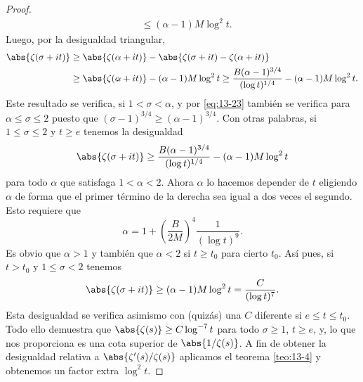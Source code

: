 \begin{proof}
\begin{align*}
            &\leq(\alpha-1)M\log^2t.
        \end{align*}
        Luego, por la desigualdad triangular,
        \begin{align*}
            \abs{\zeta(\sigma+it)}&\geq\abs{\zeta(\alpha+it)}-\abs{\zeta(\sigma+it)-\zeta(\alpha+it)}\\
            &\geq\abs{\zeta(\alpha+it)}-(\alpha-1)M\log^2t\geq\frac{B(\alpha-1)^{3/4}}{(\log t)^{1/4}}-(\alpha-1)M\log^2t.
        \end{align*}
        Este resultado se verifica, si $1<\sigma<\alpha$, y por \eqref{eq:13-23} también se
        verifica para $\alpha\leq\sigma\leq2$ puesto que $(\sigma-1)^{3/4}\geq(\alpha-1)^{3/4}$.
        Con otras palabras, si $1\leq\sigma\leq2$ y $t\geq e$ tenemos la desigualdad
        \begin{equation*}
            \abs{\zeta(\sigma+it)}\geq\frac{B(\alpha-1)^{3/4}}{(\log t)^{1/4}}-(\alpha-1)M\log^2t
        \end{equation*}
        para todo $\alpha$ que satisfaga $1<\alpha<2$. Ahora $\alpha$ lo hacemos depender de $t$
        eligiendo $\alpha$ de forma que el primer término de la derecha sea igual a dos veces el
        segundo. Esto requiere que
        \begin{equation*}
            \alpha=1+\left(\frac{B}{2M}\right)^4\frac{1}{(\log t)^9}.
        \end{equation*}
        Es obvio que $\alpha>1$ y también que $\alpha<2$ si $t\geq t_0$ para cierto $t_0$. Así
        pues, si $t>t_0$ y $1\leq\sigma<2$ tenemos
        \begin{equation*}
            \abs{\zeta(\sigma+it)}\geq(\alpha-1)M\log^2t=\frac{C}{(\log t)^7}.
        \end{equation*}
        Esta desigualdad se verifica asimismo con (quizás) una $C$ diferente si $e\leq t\leq t_0$.
        Todo ello demuestra que $\abs{\zeta(s)}\geq C\log^{-7}t$ para todo $\sigma\geq1$,
        $t\geq e$, y, lo que nos proporciona es una cota superior de $\abs{1/\zeta(s)}$. A fin de
        obtener la desigualdad relativa a $\abs{\zeta'(s)/\zeta(s)}$ aplicamos el teorema
        \ref{teo:13-4} y obtenemos un factor extra $\log^2t$.
    \end{proof}

